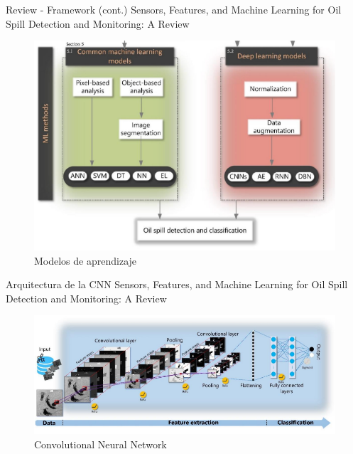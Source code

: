 \begin{frame}{Review - Framework (cont.)}
    Sensors, Features, and Machine Learning for Oil Spill Detection and Monitoring: A Review \cite{rs12203338}
    \begin{figure}
        \centering
        \includegraphics[scale=0.6]{img/section_02/framework_spill_detection2.png}
        \caption{Modelos de aprendizaje \cite{rs12203338}}
        \label{fig:my_label}
    \end{figure}
\end{frame}

\begin{frame}{Arquitectura de la CNN}
    Sensors, Features, and Machine Learning for Oil Spill Detection and Monitoring: A Review \cite{rs12203338}
    \begin{figure}
        \centering
        \includegraphics[scale=0.7]{img/section_02/oil_spill_detection_cnn_framework.png}
        \caption{Convolutional Neural Network \cite{rs12203338}}
        \label{fig:my_label}
    \end{figure}
\end{frame}
